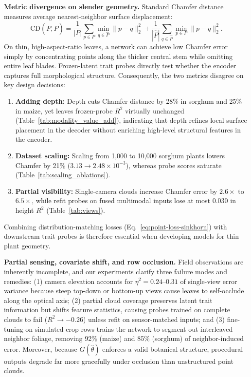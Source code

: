 \documentclass[10pt,twocolumn,letterpaper]{article}
\begin{document}
\noindent\textbf{Metric divergence on slender geometry.}
Standard Chamfer distance measures average nearest-neighbor surface displacement:
\begin{equation}
  \mathrm{CD}(P, \hat P) = \frac{1}{|P|}\sum_{p\in P}\min_{q\in\hat P}\|p-q\|_2^2 + \frac{1}{|\hat P|}\sum_{q\in\hat P}\min_{p\in P}\|p-q\|_2^2.
  \label{eq:chamfer_def}
\end{equation}
On thin, high-aspect-ratio leaves, a network can achieve low Chamfer error simply by concentrating points along the thicker central stem while omitting entire leaf blades. Frozen-latent trait probes directly test whether the encoder captures full morphological structure. Consequently, the two metrics disagree on key design decisions:
\begin{enumerate}
  \item \textbf{Adding depth:} Depth cuts Chamfer distance by 28\% in sorghum and 25\% in maize, yet leaves frozen-probe $R^2$ virtually unchanged (Table~\ref{tab:modality_value_add}), indicating that depth refines local surface placement in the decoder without enriching high-level structural features in the encoder.
  \item \textbf{Dataset scaling:} Scaling from 1{,}000 to 10{,}000 sorghum plants lowers Chamfer by 21\% ($3.13 \to 2.48 \times 10^{-3}$), whereas probe scores saturate (Table~\ref{tab:scaling_ablations}).
  \item \textbf{Partial visibility:} Single-camera clouds increase Chamfer error by $2.6\times$ to $6.5\times$, while refit probes on fused multimodal inputs lose at most 0.030 in height $R^2$ (Table~\ref{tab:views}).
\end{enumerate}
Combining distribution-matching losses (Eq.~\ref{eq:point-loss-sinkhorn}) with downstream trait probes is therefore essential when developing models for thin plant geometry.

\noindent\textbf{Partial sensing, covariate shift, and row occlusion.}
Field observations are inherently incomplete, and our experiments clarify three failure modes and remedies: (1) camera elevation accounts for $\eta^2 = 0.24\text{--}0.31$ of single-view error variance because steep top-down or bottom-up views cause leaves to self-occlude along the optical axis; (2) partial cloud coverage preserves latent trait information but shifts feature statistics, causing probes trained on complete clouds to fail ($R^2 \to -0.26$) unless refit on sensor-matched inputs; and (3) fine-tuning on simulated crop rows trains the network to segment out interleaved neighbor foliage, removing 92\% (maize) and 85\% (sorghum) of neighbor-induced error. Moreover, because $G(\hat\theta)$ enforces a valid botanical structure, procedural outputs degrade far more gracefully under occlusion than unstructured point clouds.
\end{document}
